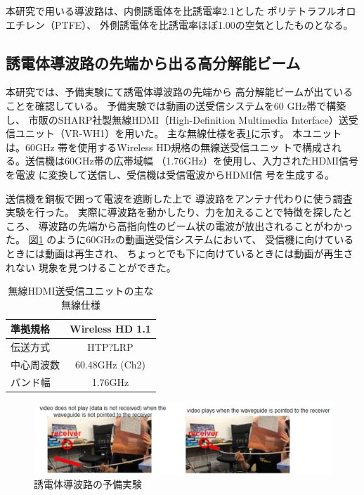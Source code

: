 \documentclass[technicalreport]{ieicej}
\begin{document}
本研究で用いる導波路は、内側誘電体を比誘電率2.1とした
ポリテトラフルオロエチレン（PTFE）、
外側誘電体を比誘電率ほぼ1.00の空気としたものとなる。

\subsection{誘電体導波路の先端から出る高分解能ビーム}

本研究では、予備実験にて誘電体導波路の先端から
高分解能ビームが出ていることを確認している。
予備実験では動画の送受信システムを60 GHz帯で構築し、
市販のSHARP社製無線HDMI（High-Definition Multimedia
Interface）送受信ユニット（VR-WH1）を用いた。
主な無線仕様を表\ref{table:wireless}に示す。
本ユニットは。60GHz
帯を使用するWireless HD規格の無線送受信ユニッ
トで構成される。送信機は60GHz帯の広帯域幅
（1.76GHz）を使用し、入力されたHDMI信号を電波
に変換して送信し、受信機は受信電波からHDMI信
号を生成する。

送信機を銅板で囲って電波を遮断した上で
導波路をアンテナ代わりに使う調査実験を行った。
実際に導波路を動かしたり、力を加えることで特徴を探したところ、
導波路の先端から高指向性のビーム状の電波が放出されることがわかった。
図\ref{fig:qualitative_experiment}
のように60GHzの動画送受信システムにおいて、
受信機に向けているときには動画は再生され、
ちょっとでも下に向けているときには動画が再生されない
現象を見つけることができた。

\begin{table}[tb]
  \centering
  \label{table:wireless}
  \caption{無線HDMI送受信ユニットの主な無線仕様}
  \begin{tabular}{lc}
    \hline
    準拠規格 & Wireless HD 1.1 \\
    \hline\hline
    伝送方式 & HTP?LRP \\
    \hline
    中心周波数 & 60.48GHz (Ch2) \\
    \hline
    バンド幅 & 1.76GHz \\
    \hline
  \end{tabular}
 \end{table}

\begin{figure}[t]
  \begin{center}
    \includegraphics[bb=0 0 630.087950 152.271255, width=1.0\linewidth]{img/qualitative_experiment.pdf}
    \caption{誘電体導波路の予備実験}
    \label{fig:qualitative_experiment}
  \end{center}
\end{figure}
\end{document}
